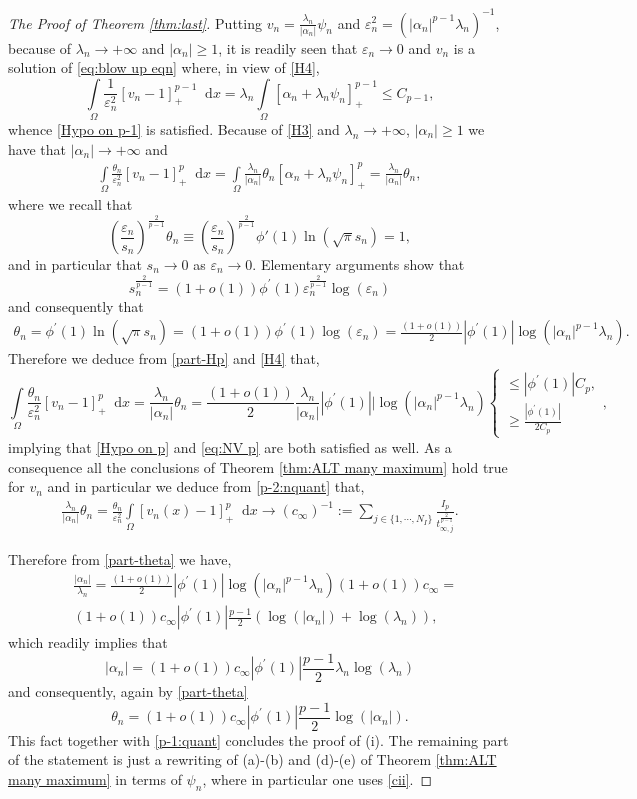 \documentclass[10pt]{amsart}
\newcommand{\parenthesis}[1]{\left(#1\right)} %
\newcommand{\dd}{\mathop{}\!\mathrm{d}}
\newcommand{\eps}{\varepsilon}
\renewcommand{\to}{\rightarrow}
\newcommand{\ii}{\infty}
\newcommand{\al}{\alpha}
\newcommand{\om}{\Omega}
\newcommand{\lm}{\lambda}
\newcommand{\graf}[1]{\left\{\begin{array}{ll}#1\end{array}\right.}
\begin{document}
\begin{proof}[{The Proof of Theorem \ref{thm:last}}]
Putting $v_n=\frac{\lm_n}{|\al_n|}\psi_n$ and $\eps^2_n=(|\al_n|^{p-1}\lm_n)^{-1}$, because of $\lm_n\to +\ii$ and $|\al_n|\geq 1$,
it is readily seen that $\eps_n\to 0$ and $v_n$ is a solution of
\eqref{eq:blow up eqn} where, in view of \eqref{H4},
$$
\int\limits_\Omega \frac{1}{\eps_n^2}[v_n-1]_+^{p-1}\dd{x}= \lm_n\int\limits_\Omega[\al_n+\lm_n\psi_n]_+^{p-1}\leq C_{p-1},
$$
whence \eqref{Hypo on p-1} is satisfied. Because of \eqref{H3} and $\lm_n\to +\ii$, $|\al_n|\geq 1$ we have that
$|\al_n|\to +\ii$ and
\begin{align}\label{part-Hp}
\int\limits_\Omega \frac{\theta_n}{\eps_n^2}[v_n-1]_+^{p}\dd{x} =
\int\limits_\Omega \frac{\lm_n}{|\al_n|}\theta_n[\al_n+\lm_n\psi_n]_+^{p}=\frac{\lm_n}{|\al_n|}\theta_n,
\end{align}
where we recall that
$$
      \parenthesis{\frac{\eps_n}{s_n}}^{\frac{2}{p-1}}\theta_n\equiv  \parenthesis{\frac{\eps_n}{s_n}}^{\frac{2}{p-1}} \phi'(1)\ln(\sqrt{\pi} s_n)=1,
$$
and in particular that $s_n\to 0$ as $\eps_n\to 0$. Elementary arguments show that
$$
s_n^{\frac{2}{p-1}}=(1+o(1))\phi^{'}(1)\eps_n^{\frac{2}{p-1}}\log(\eps_n)
$$
and consequently that
\begin{align}\label{part-theta}
\theta_n=\phi^{'}(1)\ln(\sqrt{\pi} s_n)=(1+o(1))\phi^{'}(1)\log(\eps_n)=\frac{(1+o(1))}{2}|\phi^{'}(1)|\log(|\al_n|^{p-1}\lm_n).
\end{align}
Therefore we deduce from \eqref{part-Hp} and \eqref{H4} that,
$$
\int\limits_\Omega \frac{\theta_n}{\eps_n^2}[v_n-1]_+^{p}\dd{x}=\frac{\lm_n}{|\al_n|}\theta_n=
\frac{(1+o(1))}{2}\frac{\lm_n}{|\al_n|}|\phi^{'}(1)||\log(|\al_n|^{p-1}\lm_n)\graf{\leq |\phi^{'}(1)|C_p,\\ \geq \frac{|\phi^{'}(1)|}{2 C_p}},
$$
implying that \eqref{Hypo on p} and \eqref{eq:NV p} are both satisfied as well. As a consequence all the conclusions of Theorem \ref{thm:ALT many maximum} hold true for $v_n$
and in particular we deduce from \eqref{p-2:nquant} that,
\begin{align}\label{cii}
              \frac{\lm_n}{|\al_n|}\theta_n=\frac{\theta_n}{\eps_n^2}\int\limits_{\om} [v_n(x)-1]_+^{p}\dd{x}\to
              (c_\ii)^{-1}:=\sum\limits_{j\in \{1,\cdots,N_I\}}\frac{I_p}{t_{\ii,j}^{\frac{2}{p-1}}}.
\end{align}

Therefore from \eqref{part-theta} we have,
\begin{align*}
&\frac{|\al_n|}{\lm_n}=\frac{(1+o(1))}{2}|\phi^{'}(1)|\log(|\al_n|^{p-1}\lm_n)(1+o(1))c_\ii=\\
&(1+o(1))c_\ii|\phi^{'}(1)|\frac{p-1}{2}\left(\log(|\al_n|) +\log(\lm_n)\right),
\end{align*}
which readily implies that
$$
|\al_n|=(1+o(1))c_\ii|\phi^{'}(1)|\frac{p-1}{2}\lm_n\log(\lm_n)
$$
and consequently, again by \eqref{part-theta}
$$
\theta_n=(1+o(1))c_\ii|\phi^{'}(1)|\frac{p-1}{2}\log(|\al_n|).
$$
This fact together with \eqref{p-1:quant} concludes the proof of (i). The remaining part of the statement is just a rewriting of (a)-(b)
and (d)-(e) of Theorem \ref{thm:ALT many maximum} in terms of $\psi_n$, where in particular one uses \eqref{cii}.
\end{proof}
\end{document}
